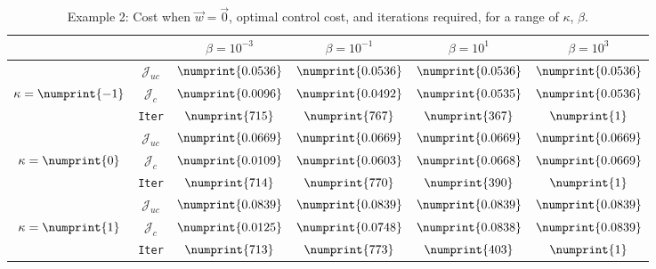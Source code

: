 \begin{table}
\begin{tabular}{ | c | c || c | c | c | c ||}
\hline
\multicolumn{2}{|c||}{}& $\beta = 10^{-3}$ & $\beta = 10^{-1}$ & $\beta = 10^{1}$ & $\beta = 10^{3}$  \\
\hline
\hline
 & $\mathcal{J}_{uc}$ & $\numprint{0.0536}$ & $\numprint{0.0536}$ & $\numprint{0.0536}$ & $\numprint{0.0536}$ \\
$\kappa= \numprint{-1}$  & $\mathcal{J}_c$ & $\numprint{0.0096}$ & $\numprint{0.0492}$ & $\numprint{0.0535}$ & $\numprint{0.0536}$ \\
& \texttt{Iter} & $\numprint{715}$ & $\numprint{767}$ & $\numprint{367}$ & $\numprint{1}$ \\
\hline
 & $\mathcal{J}_{uc}$ & $\numprint{0.0669}$ & $\numprint{0.0669}$ & $\numprint{0.0669}$ & $\numprint{0.0669}$ \\
$\kappa= \numprint{0}$  & $\mathcal{J}_c$ & $\numprint{0.0109}$ & $\numprint{0.0603}$ & $\numprint{0.0668}$ & $\numprint{0.0669}$ \\
& \texttt{Iter} & $\numprint{714}$ & $\numprint{770}$ & $\numprint{390}$ & $\numprint{1}$ \\
\hline
 & $\mathcal{J}_{uc}$ & $\numprint{0.0839}$ & $\numprint{0.0839}$ & $\numprint{0.0839}$ & $\numprint{0.0839}$ \\
$\kappa= \numprint{1}$  & $\mathcal{J}_c$ & $\numprint{0.0125}$ & $\numprint{0.0748}$ & $\numprint{0.0838}$ & $\numprint{0.0839}$ \\
& \texttt{Iter} & $\numprint{713}$ & $\numprint{773}$ & $\numprint{403}$ & $\numprint{1}$ \\
\hline
\end{tabular}
\caption{Example 2: Cost when $\vec{w}=\vec{0}$, optimal control cost, and iterations required, for a range of $\kappa$, $\beta$.}
\label{TabS5:Prob2}
\end{table}